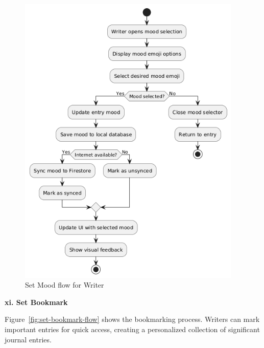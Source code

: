 \begin{figure}[H]
\centering
\includegraphics[width=0.95\textwidth,height=0.7\textheight,keepaspectratio]{files/imgs/set_mood_flow.png}
\caption{Set Mood flow for Writer}
\label{fig:set-mood-flow}
\end{figure}
\clearpage

\textbf{xi. Set Bookmark}


Figure~\ref{fig:set-bookmark-flow} shows the bookmarking process. Writers can mark important entries for quick access, creating a personalized collection of significant journal entries.

